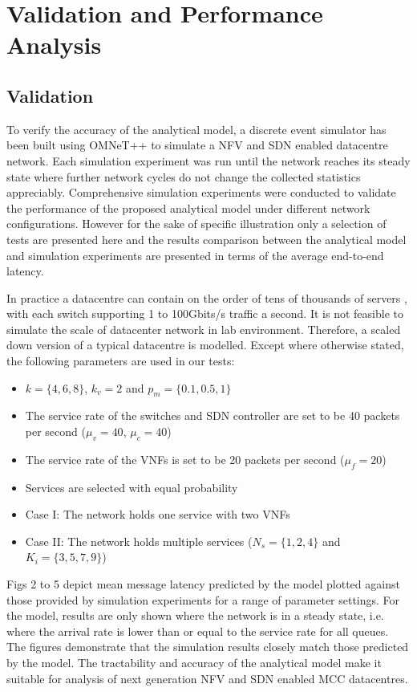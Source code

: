 \section{Validation and Performance Analysis}
\label{sec:validation}

\subsection{Validation}

To verify the accuracy of the analytical model, a discrete event simulator has been built using OMNeT++ \cite{VargaH08} to simulate a NFV and SDN enabled datacentre network. Each simulation experiment was run until the network reaches its steady state where further network cycles do not change the collected statistics appreciably. Comprehensive simulation experiments were conducted to validate the performance of the proposed analytical model under different network configurations. However for the sake of specific illustration only a selection of tests are presented here and the results comparison between the analytical model and simulation experiments are presented in terms of the average end-to-end latency.

In practice a datacentre can contain on the order of tens of thousands of servers \cite{AWS16}, with each switch supporting 1 to 100Gbits/s traffic a second. It is not feasible to simulate the scale of datacenter network in lab environment. Therefore, a scaled down version of a typical datacentre is modelled. Except where otherwise stated, the following parameters are used in our tests:

\begin{itemize}
	\item $k = \{4, 6, 8\}$, $k_{v} = 2$ and $p_{m} = \{0.1, 0.5, 1\}$
	\item The service rate of the switches and SDN controller are set to be 40 packets per second ($\mu_{v} = 40$, $\mu_{c} = 40$)
	\item The service rate of the VNFs is set to be 20 packets per second ($\mu_{f} = 20$)
	\item Services are selected with equal probability
	\item Case I: The network holds one service with two VNFs
	\item Case II: The network holds multiple services ($N_s = \{1,2,4\}$ and $K_i=\{3,5,7,9\}$)
	\end{itemize}
	
	Figs 2 to 5 depict mean message latency predicted by the model plotted against those provided by simulation experiments for a range of parameter settings. For the model, results are only shown where the network is in a steady state, i.e. where the arrival rate is lower than or equal to the service rate for all queues. The figures demonstrate that the simulation results closely match those predicted by the model. The tractability and accuracy of the analytical model make it suitable for analysis of next generation NFV and SDN enabled MCC datacentres.
	
